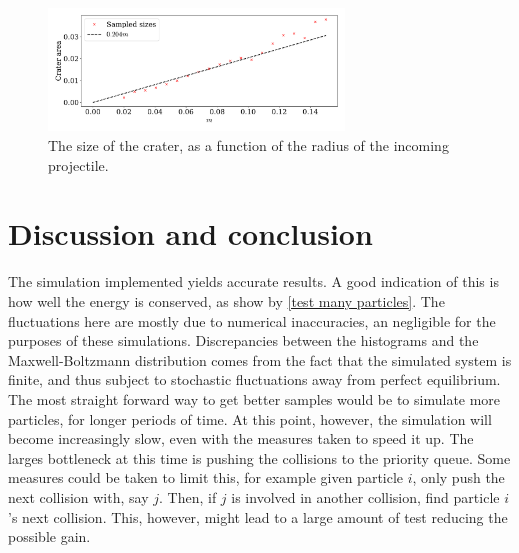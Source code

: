 \documentclass{article}
\begin{document}
    \begin{figure}[H]
        \centering
        \includegraphics[width=0.7\textwidth]{../plots/problem4/crater_size.pdf}
        \caption{The size of the crater, as a function of the radius of the incoming projectile.}
        \label{crater size}
    \end{figure}

    \section*{Discussion and conclusion}
    The simulation implemented yields accurate results. A good indication of this is how well the energy is conserved, as show by \autoref{test many particles}. The fluctuations here are mostly due to numerical inaccuracies, an negligible for the purposes of these simulations. Discrepancies between the histograms and the Maxwell-Boltzmann distribution comes from the fact that the simulated system is finite, and thus subject to stochastic fluctuations away from perfect equilibrium. The most straight forward way to get better samples would be to simulate more particles, for longer periods of time. At this point, however, the simulation will become increasingly slow, even with the measures taken to speed it up. The larges bottleneck at this time is pushing the collisions to the priority queue. Some measures could be taken to limit this, for example given particle $i$, only push the next collision with, say $j$. Then, if $j$ is involved in another collision, find particle $i$'s next collision. This, however, might lead to a large amount of test reducing the possible gain.
    
    \printbibliography
\end{document}
